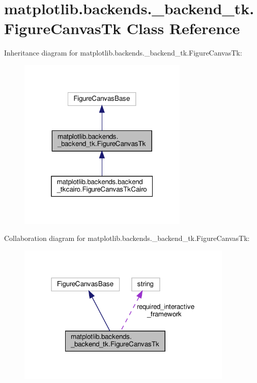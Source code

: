 \hypertarget{classmatplotlib_1_1backends_1_1__backend__tk_1_1FigureCanvasTk}{}\section{matplotlib.\+backends.\+\_\+backend\+\_\+tk.\+Figure\+Canvas\+Tk Class Reference}
\label{classmatplotlib_1_1backends_1_1__backend__tk_1_1FigureCanvasTk}


Inheritance diagram for matplotlib.\+backends.\+\_\+backend\+\_\+tk.\+Figure\+Canvas\+Tk\+:
\nopagebreak
\begin{figure}[H]
\begin{center}
\leavevmode
\includegraphics[width=229pt]{classmatplotlib_1_1backends_1_1__backend__tk_1_1FigureCanvasTk__inherit__graph}
\end{center}
\end{figure}


Collaboration diagram for matplotlib.\+backends.\+\_\+backend\+\_\+tk.\+Figure\+Canvas\+Tk\+:
\nopagebreak
\begin{figure}[H]
\begin{center}
\leavevmode
\includegraphics[width=291pt]{classmatplotlib_1_1backends_1_1__backend__tk_1_1FigureCanvasTk__coll__graph}
\end{center}
\end{figure}
